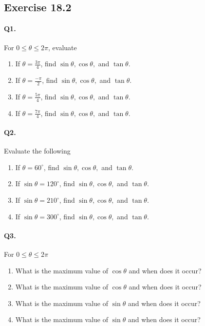 \documentclass{article}
\begin{document}
\subsection {Exercise 18.2}
\paragraph{Q1.}
For $0\leq\theta\leq2\pi$, evaluate

\begin{enumerate}[label=\alph*)]
  \item If $\theta=\frac{3\pi}{4}$, find $\sin\theta, \cos\theta,$ and $\tan\theta$.
  \item If $\theta=\frac{-\pi}{2}$, find $\sin\theta, \cos\theta,$ and $\tan\theta$.
  \item If $\theta=\frac{5\pi}{4}$, find $\sin\theta, \cos\theta,$ and $\tan\theta$.
  \item If $\theta=\frac{7\pi}{4}$, find $\sin\theta, \cos\theta,$ and $\tan\theta$.
\end{enumerate}

\paragraph{Q2.}
Evaluate the following

\begin{enumerate}[label=\alph*)]
  \item If $\theta=60^{\circ}$, find $\sin\theta, \cos\theta,$ and $\tan\theta$.
  \item If $\sin\theta=120^{\circ}$, find $\sin\theta, \cos\theta,$ and $\tan\theta$.
  \item If $\sin\theta=210^{\circ}$, find $\sin\theta, \cos\theta,$ and $\tan\theta$.
  \item If $\sin\theta=300^{\circ}$, find $\sin\theta, \cos\theta,$ and $\tan\theta$.
\end{enumerate}

\paragraph{Q3.}
For $0\leq\theta\leq2\pi$

\begin{enumerate}[label=\alph*)]
  \item What is the maximum value of $\cos\theta$ and when does it occur?
  \item What is the maximum value of $\cos\theta$ and when does it occur?
  \item What is the maximum value of $\sin\theta$ and when does it occur?
  \item What is the maximum value of $\sin\theta$ and when does it occur?
\end{enumerate}
\end{document}
